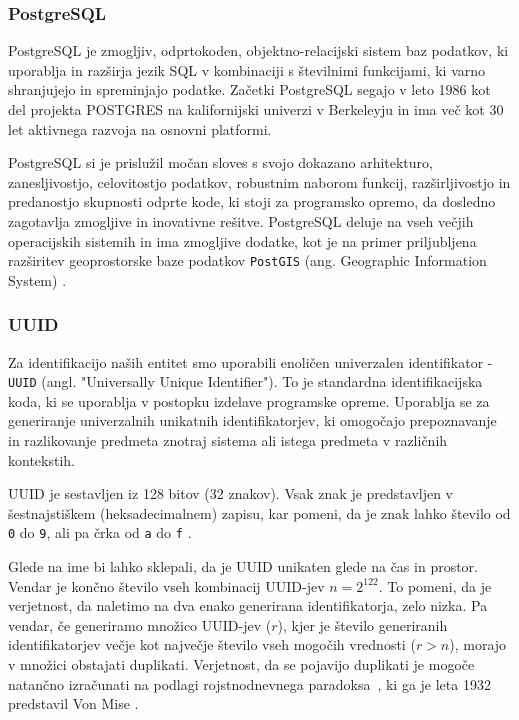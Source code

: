\documentclass[a4paper, 12pt]{book}
\begin{document}
\subsubsection{PostgreSQL}
PostgreSQL je zmogljiv, odprtokoden, objektno-relacijski sistem baz podatkov, ki uporablja in razširja jezik SQL v kombinaciji s številnimi funkcijami, ki varno shranjujejo in spreminjajo podatke. Začetki PostgreSQL segajo v leto 1986 kot del projekta POSTGRES na kalifornijski univerzi v Berkeleyju in ima več kot 30 let aktivnega razvoja na osnovni platformi.

PostgreSQL si je prislužil močan sloves s svojo dokazano arhitekturo, zanesljivostjo, celovitostjo podatkov, robustnim naborom funkcij, razširljivostjo in predanostjo skupnosti odprte kode, ki stoji za programsko opremo, da dosledno zagotavlja zmogljive in inovativne rešitve. 
PostgreSQL deluje na vseh večjih operacijskih sistemih in ima zmogljive dodatke, kot je na primer priljubljena razširitev geoprostorske baze podatkov \verb=PostGIS= (ang. Geographic Information System) \cite{pg-database-postgis}.


\subsubsection{UUID}
Za identifikacijo naših entitet smo uporabili enoličen univerzalen identifikator - \verb=UUID= (angl. "Universally Unique Identifier"). To je standardna identifikacijska koda, ki se uporablja v postopku izdelave programske opreme. Uporablja se za generiranje univerzalnih unikatnih identifikatorjev, ki omogočajo prepoznavanje in razlikovanje predmeta znotraj sistema ali istega predmeta v različnih kontekstih.

UUID je sestavljen iz 128 bitov (32 znakov). Vsak znak je predstavljen v šestnajstiškem (heksadecimalnem) zapisu, kar pomeni, da je znak lahko število od \verb=0= do \verb=9=, ali pa črka od \verb=a= do \verb=f= \cite{uuid-rfc}.

Glede na ime bi lahko sklepali, da je UUID unikaten glede na čas in prostor. Vendar je končno število vseh kombinacij UUID-jev $n=2^{122}$. To pomeni, da je verjetnost, da naletimo na dva enako generirana identifikatorja, zelo nizka.
Pa vendar, če generiramo množico UUID-jev ($r$), kjer je število generiranih identifikatorjev večje kot največje število vseh mogočih vrednosti ($r > n$), morajo v množici obstajati duplikati. Verjetnost, da se pojavijo duplikati je mogoče natančno izračunati na podlagi rojstnodnevnega paradoksa~\cite{birthday-problem-what-is}, ki ga je leta 1932 predstavil Von Mise \cite{birthday-problem-inventor}.
\end{document}
